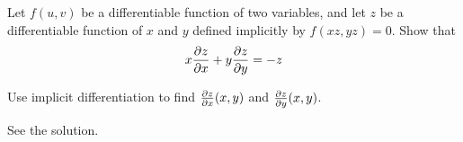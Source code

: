 \begin{question}[M200 2014D] %
Let $f(u,v)$ be a differentiable function of two variables, and let $z$ 
be a differentiable function of $x$ and $y$ defined implicitly by 
$f(xz,yz) = 0$. Show that
\begin{equation*}
x\pdiff{z}{x}+y\pdiff{z}{y} = -z
\end{equation*}
\end{question}

\begin{hint}
Use implicit differentiation to find $\pdiff{z}{x}(x,y)$ and 
$\pdiff{z}{y}(x,y)$.
\end{hint}

\begin{answer}
See the solution.
\end{answer}

